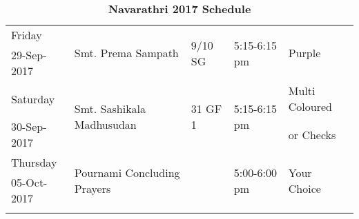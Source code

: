 \documentclass[12pt]{article}
\begin{document}
\begin{center}
\begin{longtable}{|p{}|p{}|p{}|p{}|p{}|}
Friday&\multirow{2}{*}{Smt. Prema Sampath}&\multirow{2}{*}{9/10 SG}&\multirow{2}{*}{5:15-6:15 pm}&\multirow{2}{*}{Purple}\\
29-Sep-2017&&&&\\\hline

Saturday&\multirow{2}{*}{Smt. Sashikala Madhusudan}&\multirow{2}{*}{31 GF 1}&\multirow{2}{*}{5:15-6:15 pm}&Multi Coloured\\
30-Sep-2017&&&&or Checks\\\hline

Thursday&\multirow{2}{*}{Pournami Concluding Prayers}&\multirow{2}{*}{}&\multirow{2}{*}{5:00-6:00 pm}&\multirow{2}{*}{Your Choice}\\
05-Oct-2017&&&&\\\hline

\caption*{\textbf{Navarathri 2017 Schedule}}
\label{table:programme2017}
\end{longtable}
\end{center}
\end{document}
